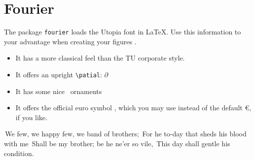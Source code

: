 \section{Fourier}

The package \texttt{fourier} loads the Utopia font in \LaTeX. Use this information to your advantage when creating your figures \textthing.

\begin{itemize}
    \renewcommand\labelitemi\lefthand
    \item It has a more classical feel than the TU corporate style.
    \item It offers an upright \verb|\patial|: \(\partial\)
    \item It has some nice \floweroneleft\ ornaments \floweroneright
    \item It offers the official euro symbol \eurologo, which you may use instead of the default €, if you like.
\end{itemize}

\textcolor{newred}{\oldpilcrowfour}\,We few,
we happy few, we band of brothers; \textcolor{newred}
{\oldpilcrowfive}\,For he to-day that sheds his blood with
me \textcolor{newred}{\oldpilcrowsix}\,Shall be my brother;
be he ne'er so vile, \textcolor{newred}
{\oldpilcrowfour}\,This day shall gentle his condition.
